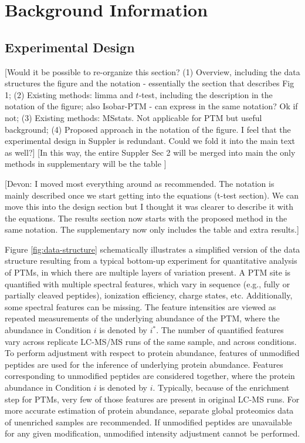 \documentclass[mcp]{article}
\numberwithin{table}{section}
\def\todo#1{{\color{red}[#1]}}
\begin{document}
\section*{Background Information}

\subsection*{Experimental Design}

\todo{Would it be possible to re-organize this section? (1) Overview, including the data structures  the figure and the notation - essentially the section that describes Fig 1; (2) Existing methods: limma and $t$-test, including the description in the notation of the figure; also Isobar-PTM - can express in the same notation? Ok if not; (3) Existing methods: MSstats. Not applicable for PTM but useful background; (4) Proposed approach in the notation of the figure. I feel that the experimental design in Suppler is redundant. Could we fold it into the main text as well?} \todo{In this way, the entire Suppler Sec 2 will be merged into main \; the only methods in supplementary will be the table }

\todo{Devon: I moved most everything around as recommended. The notation is mainly described once we start getting into the equations (t-test section). We can move this into the design section but I thought it was clearer to describe it with the equations. The results section now starts with the proposed method in the same notation. The supplementary now only includes the table and extra results.}

Figure \ref{fig:data-structure} schematically illustrates a simplified version of the data structure resulting from a typical bottom-up experiment for quantitative analysis of PTMs, in which there are multiple layers of variation present. A PTM site is quantified with multiple spectral features, which vary in sequence (e.g., fully or partially cleaved peptides), ionization efficiency, charge states, etc. Additionally, some spectral features can be missing. The feature intensities are viewed as repeated measurements of the underlying abundance of the PTM, where the abundance in Condition $i$ is denoted by $i^{\ast}$.  The number of quantified features vary across replicate LC-MS/MS runs of the same sample, and across conditions. To perform adjustment with respect to protein abundance, features of unmodified peptides are used for the inference of underlying protein abundance. Features corresponding to unmodified peptides are considered together, where the protein abundance in Condition $i$ is denoted by $i$. Typically, because of the enrichment step for PTMs, very few of those features are present in original LC-MS runs. For more accurate estimation of protein abundance, separate global proteomics data of unenriched samples are recommended. If unmodified peptides are unavailable for any given modification, unmodified intensity adjustment cannot be performed.
\end{document}
